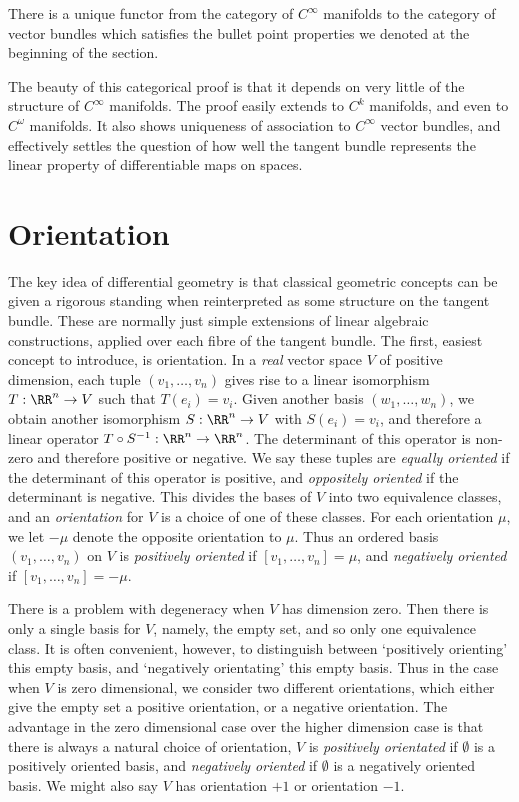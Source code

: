 \begin{theorem}
    There is a unique functor from the category of $C^\infty$ manifolds to the category of vector bundles which satisfies the bullet point properties we denoted at the beginning of the section.
\end{theorem}

The beauty of this categorical proof is that it depends on very little of the structure of $C^\infty$ manifolds. The proof easily extends to $C^k$ manifolds, and even to $C^\omega$ manifolds. It also shows uniqueness of association to $C^\infty$ vector bundles, and effectively settles the question of how well the tangent bundle represents the linear property of differentiable maps on spaces.

\section{Orientation}

The key idea of differential geometry is that classical geometric concepts can be given a rigorous standing when reinterpreted as some structure on the tangent bundle. These are normally just simple extensions of linear algebraic constructions, applied over each fibre of the tangent bundle. The first, easiest concept to introduce, is orientation. In a {\it real} vector space $V$ of positive dimension, each tuple $(v_1, \dots, v_n)$ gives rise to a linear isomorphism $T: \RR^n \to V$ such that $T(e_i) = v_i$. Given another basis $(w_1, \dots, w_n)$, we obtain another isomorphism $S: \RR^n \to V$ with $S(e_i) = v_i$, and therefore a linear operator $T \circ S^{-1}: \RR^n \to \RR^n$. The determinant of this operator is non-zero and therefore positive or negative. We say these tuples are {\it equally oriented} if the determinant of this operator is positive, and {\it oppositely oriented} if the determinant is negative. This divides the bases of $V$ into two equivalence classes, and an \emph{orientation} for $V$ is a choice of one of these classes. For each orientation $\mu$, we let $- \mu$ denote the opposite orientation to $\mu$. Thus an ordered basis $(v_1, \dots, v_n)$ on $V$ is \emph{positively oriented} if $[v_1, \dots, v_n] = \mu$, and \emph{negatively oriented} if $[v_1, \dots, v_n] = -\mu$.

\begin{remark}
    There is a problem with degeneracy when $V$ has dimension zero. Then there is only a single basis for $V$, namely, the empty set, and so only one equivalence class. It is often convenient, however, to distinguish between `positively orienting' this empty basis, and `negatively orientating' this empty basis. Thus in the case when $V$ is zero dimensional, we consider two different orientations, which either give the empty set a positive orientation, or a negative orientation. The advantage in the zero dimensional case over the higher dimension case is that there is always a natural choice of orientation, $V$ is \emph{positively orientated} if $\emptyset$ is a positively oriented basis, and \emph{negatively oriented} if $\emptyset$ is a negatively oriented basis. We might also say $V$ has orientation $+1$ or orientation $-1$.
\end{remark}

